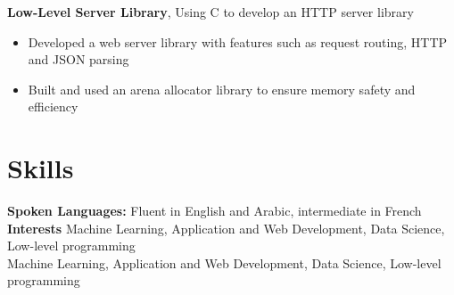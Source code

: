 \documentclass[]{article}
\begin{document}
\textbf{Low-Level Server Library}, Using C to develop an HTTP server library
\begin{itemize}
	\item Developed a web server library with features such as request routing, HTTP and JSON parsing
	\item Built and used an arena allocator library to ensure memory safety and efficiency
\end{itemize}

\section{Skills}
\textbf{Spoken Languages:} Fluent in English and Arabic, intermediate in French\\
\textbf{Interests} Machine Learning, Application and Web Development, Data Science, Low-level programming\\
\textbf{} Machine Learning, Application and Web Development, Data Science, Low-level programming\\
\end{document}
